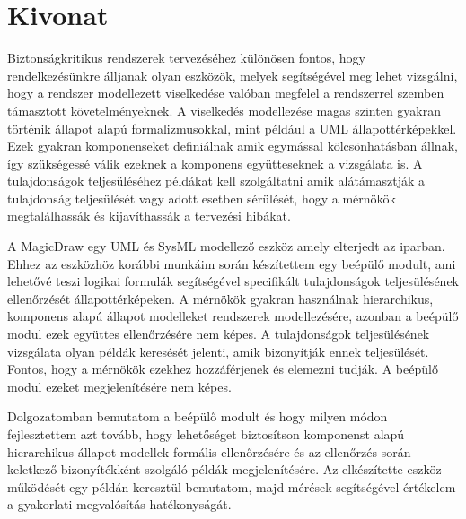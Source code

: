 \setcounter{page}{1}

\selecthungarian

\chapter*{Kivonat}


Biztonságkritikus rendszerek tervezéséhez különösen fontos, hogy rendelkezésünkre álljanak olyan eszközök, melyek segítségével meg lehet vizsgálni, hogy a rendszer modellezett viselkedése valóban megfelel a rendszerrel szemben támasztott követelményeknek. A viselkedés modellezése magas szinten gyakran történik állapot alapú formalizmusokkal, mint például a UML állapottérképekkel. Ezek gyakran komponenseket definiálnak amik egymással kölcsönhatásban állnak, így szükségessé válik ezeknek a komponens együtteseknek a vizsgálata is. A tulajdonságok teljesüléséhez példákat kell szolgáltatni amik alátámasztják a tulajdonság teljesülését vagy adott esetben sérülését, hogy a mérnökök megtalálhassák és kijavíthassák a tervezési hibákat.

A MagicDraw egy UML és SysML modellező eszköz amely elterjedt az iparban. Ehhez az eszközhöz korábbi munkáim során készítettem egy beépülő modult, ami lehetővé teszi logikai formulák segítségével specifikált tulajdonságok teljesülésének ellenőrzését állapottérképeken. A mérnökök gyakran használnak hierarchikus, komponens alapú állapot modelleket rendszerek modellezésére, azonban a beépülő modul ezek együttes ellenőrzésére nem képes. A tulajdonságok teljesülésének vizsgálata olyan példák keresését jelenti, amik bizonyítják ennek teljesülését. Fontos, hogy a mérnökök ezekhez hozzáférjenek és elemezni tudják. A beépülő modul ezeket megjelenítésére nem képes.

Dolgozatomban bemutatom a beépülő modult és hogy milyen módon fejlesztettem azt tovább, hogy lehetőséget biztosítson komponenst alapú hierarchikus állapot modellek formális ellenőrzésére és az ellenőrzés során keletkező bizonyítékként szolgáló példák megjelenítésére. Az elkészítette eszköz működését egy példán keresztül bemutatom, majd mérések segítségével értékelem a gyakorlati megvalósítás hatékonyságát.


\vfill
\selectenglish


